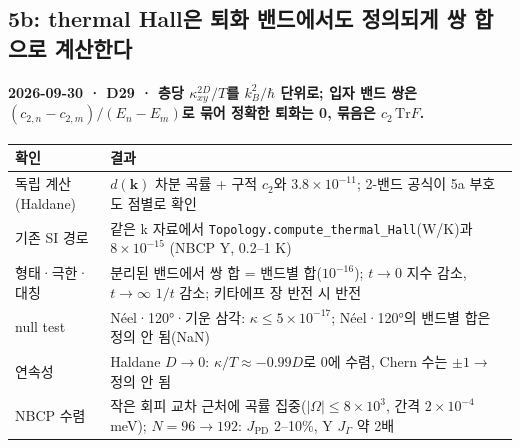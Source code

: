 \subsection{5b: thermal Hall은 퇴화 밴드에서도 정의되게 쌍 합으로 계산한다}\label{stage5b}
\begingroup%
  \framesubtitle{2026-09-30 · D29 · 층당 $\kappa_{xy}^{2D}/T$를 $k_B^2/\hbar$ 단위로; 입자 밴드 쌍은 $(c_{2,n}-c_{2,m})/(E_n-E_m)$로 묶어 정확한 퇴화는 0, 묶음은 $c_2\,\mathrm{Tr}F$.}
  \footnotesize\renewcommand{\arraystretch}{1.06}
  \begin{tabularx}{\textwidth}{@{}P{3.2cm}Y@{}}
    \toprule
    확인 & 결과 \\
    \midrule
    독립 계산(Haldane) & $d(\mathbf k)$ 차분 곡률 + 구적 $c_2$와 $3.8\times10^{-11}$; 2-밴드 공식이 5a 부호도 점별로 확인 \\
    기존 SI 경로 & 같은 k 자료에서 \texttt{Topology.compute\_thermal\_Hall}(W/K)과 $8\times10^{-15}$ (NBCP Y, 0.2--1 K) \\
    형태·극한·대칭 & 분리된 밴드에서 쌍 합 = 밴드별 합($10^{-16}$); $t\to0$ 지수 감소, $t\to\infty$ $1/t$ 감소; 키타에프 장 반전 시 반전 \\
    null test & Néel·120°·기운 삼각: $\kappa\le5\times10^{-17}$; Néel·120°의 밴드별 합은 정의 안 됨(NaN) \\
    연속성 & Haldane $D\to0$: $\kappa/T\approx-0.99D$로 0에 수렴, Chern 수는 $\pm1\to$ 정의 안 됨 \\
    NBCP 수렴 & 작은 회피 교차 근처에 곡률 집중($|\Omega|\le8\times10^3$, 간격 $2\times10^{-4}$ meV); $N=96\to192$: $J_{\mathrm{PD}}$ 2--10\%, Y $J_\Gamma$ 약 2배 \\
    \bottomrule
  \end{tabularx}
  \par\smallskip
\endgroup


